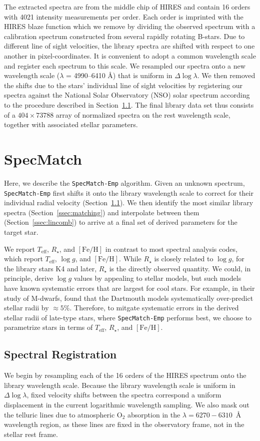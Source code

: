 \documentclass[preprint2]{aastex6}
\newcommand{\SpecMatch}{\texttt{SpecMatch-Emp}\xspace}
\newcommand{\Rstar}{\ensuremath{R_{\star}}\xspace}
\newcommand{\fe}{\ensuremath{\mathrm{[Fe/H]}}\xspace}
\newcommand{\teff}{\ensuremath{T_{\mathrm{eff}}}\xspace}
\newcommand{\logg}{\ensuremath{\log g}\xspace}
\newcommand{\angstrom}{\AA\xspace}
\newcommand{\libnum}{404\xspace}
\newcommand{\nwav}{73788\xspace}
\begin{document}
The extracted spectra are from the middle chip of HIRES and contain 16 orders with 4021 intensity measurements per order. Each order is imprinted with the HIRES blaze function which we remove by dividing the observed spectrum with a calibration spectrum constructed from several rapidly rotating B-stars. Due to different line of sight velocities, the library spectra are shifted with respect to one another in pixel-coordinates. It is convenient to adopt a common wavelength scale and register each spectrum to this scale. We resampled our spectra onto a new wavelength scale ($\lambda$ = 4990--6410 \angstrom) that is uniform in $\Delta \log \lambda$. We then removed the shifts due to the stars' individual line of sight velocities by registering our spectra against the National Solar Observatory (NSO) solar spectrum \citep{Kurucz84} according to the procedure described in Section~\ref{ssec:shifting}. The final library data set thus consists of a $\libnum \times \nwav$ array of normalized spectra on the rest wavelength scale, together with associated stellar parameters.

\section{SpecMatch} 
\label{sec:specmatchalg}
Here, we describe the \SpecMatch algorithm. Given an unknown spectrum, \SpecMatch first shifts it onto the library wavelength scale to correct for their individual radial velocity (Section~\ref{ssec:shifting}). We then identify the most similar library spectra (Section~\ref{ssec:matching}) and interpolate between them (Section~\ref{ssec:lincomb}) to arrive at a final set of derived parameters for the target star.

We report \teff, \Rstar, and \fe in contrast to most spectral analysis codes, which report \teff, \logg, and \fe. While \Rstar is closely related to \logg, for the library stars K4 and later, \Rstar is the directly observed quantity. We could, in principle, derive \logg values by appealing to stellar models, but such models have known systematic errors that are largest for cool stars. For example, in their study of M-dwarfs, \cite{Mann15} found that the Dartmouth models systematically over-predict stellar radii by $\approx 5\%$. Therefore, to mitgate systematic errors in the derived stellar radii of late-type stars, where \SpecMatch performs best, we choose to parametrize stars in terms of \teff, \Rstar, and \fe.

\subsection{Spectral Registration} 
\label{ssec:shifting}
We begin by resampling each of the 16 orders of the HIRES spectrum onto the library wavelength scale. Because the library wavelength scale is uniform in $\Delta \log \lambda$, fixed velocity shifts between the spectra correspond a uniform displacement in the current logarithmic wavelength sampling. We also mask out the telluric lines due to atmospheric O$_2$ absorption in the $\lambda = 6270-6310$~\angstrom wavelength region, as these lines are fixed in the observatory frame, not in the stellar rest frame. 
\end{document}
